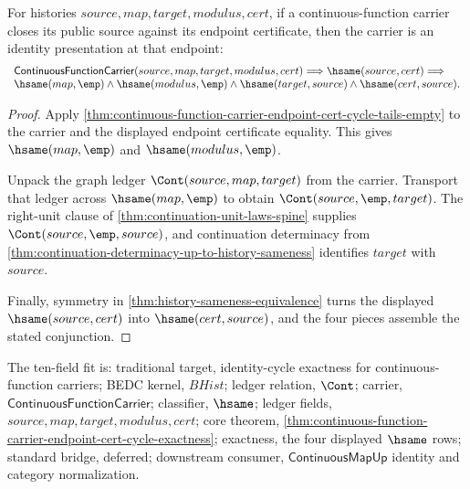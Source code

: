 \begin{theorem}
\label{thm:continuous-function-carrier-endpoint-cert-cycle-exactness}
For histories $source,map,target,modulus,cert$, if a continuous-function carrier
closes its public source against its endpoint certificate, then the carrier is an
identity presentation at that endpoint:
$$
\begin{array}{l}
\mathsf{ContinuousFunctionCarrier}(source,map,target,modulus,cert)
\Longrightarrow
\hsame(source,cert)
\Longrightarrow
\\
\hsame(map,\emp)\land\hsame(modulus,\emp)\land
\hsame(target,source)\land\hsame(cert,source).
\end{array}
$$
\end{theorem}
\begin{proof}
Apply \autoref{thm:continuous-function-carrier-endpoint-cert-cycle-tails-empty}
to the carrier and the displayed endpoint certificate equality. This gives
$\hsame(map,\emp)$ and $\hsame(modulus,\emp)$.

Unpack the graph ledger $\Cont(source,map,target)$ from the carrier. Transport
that ledger across $\hsame(map,\emp)$ to obtain $\Cont(source,\emp,target)$. The
right-unit clause of \autoref{thm:continuation-unit-laws-spine} supplies
$\Cont(source,\emp,source)$, and continuation determinacy from
\autoref{thm:continuation-determinacy-up-to-history-sameness} identifies
$target$ with $source$.

Finally, symmetry in \autoref{thm:history-sameness-equivalence} turns the
displayed $\hsame(source,cert)$ into $\hsame(cert,source)$, and the four
pieces assemble the stated conjunction.
\end{proof}

The ten-field fit is: traditional target, identity-cycle exactness for
continuous-function carriers; BEDC kernel, $BHist$; ledger relation, $\Cont$;
carrier, $\mathsf{ContinuousFunctionCarrier}$; classifier, $\hsame$; ledger
fields, $source,map,target,modulus,cert$; core theorem,
\autoref{thm:continuous-function-carrier-endpoint-cert-cycle-exactness};
exactness, the four displayed $\hsame$ rows; standard bridge, deferred;
downstream consumer, $\mathsf{ContinuousMapUp}$ identity and category
normalization.

